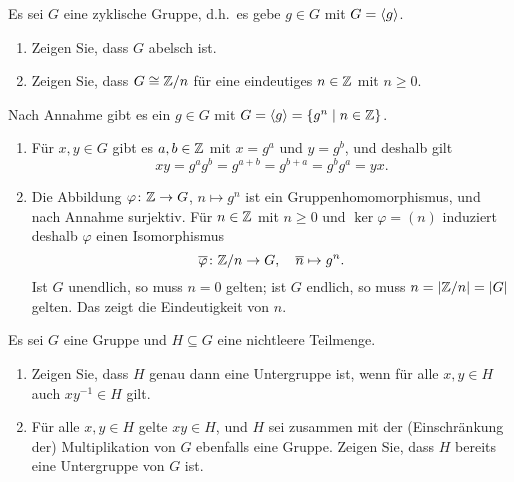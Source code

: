 \begin{question}[subtitle = Klassifikation zyklischer Gruppen]
  Es sei $G$ eine zyklische Gruppe, d.h.\ es gebe $g \in G$ mit $G = \langle g\rangle$.
  \begin{enumerate}
    \item
      Zeigen Sie, dass $G$ abelsch ist.
    \item
      Zeigen Sie, dass $G \cong \mathbb{Z}/n$ für eine eindeutiges $n \in \mathbb{Z}$ mit $n \geq 0$.
  \end{enumerate}
\end{question}


\begin{solution}
  \label{question: classification of cyclic groups}
  Nach Annahme gibt es ein $g \in G$ mit $G = \langle g\rangle = \{g^n \mid n \in \mathbb{Z}\}$.
  \begin{enumerate}
    \item
      Für $x, y \in G$ gibt es $a, b \in \mathbb{Z}$ mit $x = g^a$ und $y = g^b$, und deshalb gilt
      \[
        xy = g^a g^b = g^{a+b} = g^{b+a} = g^b g^a = yx.
      \]
      
    \item
      Die Abbildung $\varphi \colon \mathbb{Z} \to G$, $n \mapsto g^n$ ist ein Gruppenhomomorphismus, und nach Annahme surjektiv.
      Für $n \in \mathbb{Z}$ mit $n \geq 0$ und $\ker \varphi = (n)$ induziert deshalb $\varphi$ einen Isomorphismus
      \[
        \overline{\varphi} \colon \mathbb{Z}/n \to G,
        \quad
        \overline{n} \mapsto g^n.
      \]
      Ist $G$ unendlich, so muss $n = 0$ gelten;
      ist $G$ endlich, so muss $n = |\mathbb{Z}/n| = |G|$ gelten.
      Das zeigt die Eindeutigkeit von $n$.
  \end{enumerate}
\end{solution}


\begin{question}[subtitle = Zur Definition von Untergruppen]
  Es sei $G$ eine Gruppe und $H \subseteq G$ eine nichtleere Teilmenge.
  \begin{enumerate}
    \item
      Zeigen Sie, dass $H$ genau dann eine Untergruppe ist, wenn für alle $x, y \in H$ auch $x y^{-1} \in H$ gilt.
    \item
      Für alle $x, y \in H$ gelte $xy \in H$, und $H$ sei zusammen mit der (Einschränkung der) Multiplikation von $G$ ebenfalls eine Gruppe.
      Zeigen Sie, dass $H$ bereits eine Untergruppe von $G$ ist.
  \end{enumerate}
\end{question}


